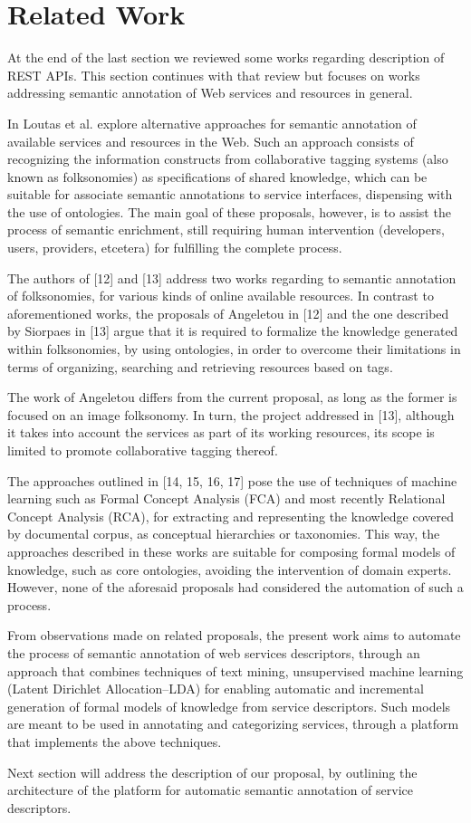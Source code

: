 \section{Related Work}
\label{sec:related_work}

\noindent At the end of the last section we reviewed some works regarding description of REST APIs. This section continues with that review but focuses on works addressing semantic annotation of Web services and resources in general.

In \cite{Loutas:2010} Loutas et al. explore alternative approaches for semantic annotation of available services and resources in the Web. Such an approach consists of recognizing the information constructs from collaborative tagging systems (also known as folksonomies) as specifications of shared knowledge, which can be suitable for associate semantic annotations to service interfaces, dispensing with the use of ontologies. The main goal of these proposals, however, is to assist the process of semantic enrichment, still requiring human intervention (developers, users, providers, etcetera) for fulfilling the complete process. 

The authors of [12] and [13] address two works regarding to semantic annotation of folksonomies, for various kinds of online available resources. In contrast to aforementioned works, the proposals of Angeletou in [12] and the one described by Siorpaes in [13] argue that it is required to formalize the knowledge generated within folksonomies, by using ontologies, in order to overcome their limitations in terms of organizing, searching and retrieving resources based on tags.

The work of Angeletou differs from the current proposal, as long as the former is focused on an image folksonomy. In turn, the project addressed in [13], although it takes into account the services as part of its working resources, its scope is limited to promote collaborative tagging thereof.

The approaches outlined in [14, 15, 16, 17] pose the use of techniques of machine learning such as Formal Concept Analysis (FCA) and most recently Relational Concept Analysis (RCA), for extracting and representing the knowledge covered by documental corpus, as conceptual hierarchies or taxonomies. This way, the approaches described in these works are suitable for composing formal models of knowledge, such as core ontologies, avoiding the intervention of domain experts. However, none of the aforesaid proposals had considered the automation of such a process.

From observations made on related proposals, the present work aims to automate the process of semantic annotation of web services descriptors, through an approach that combines techniques of text mining, unsupervised machine learning (Latent Dirichlet Allocation–LDA) for enabling  automatic and incremental generation of formal models of knowledge from service descriptors. Such models are meant to be used in annotating and categorizing services, through a platform that implements the above techniques. 

Next section will address the description of our proposal, by outlining the architecture of the platform for automatic semantic annotation of service descriptors.
